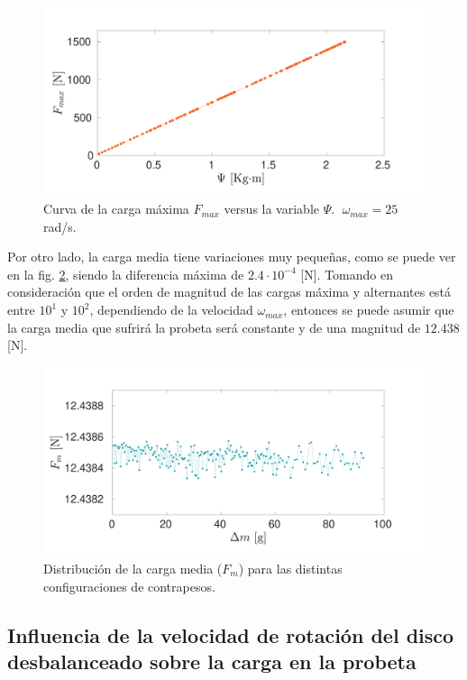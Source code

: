 \begin{figure}[]
\centering
\includegraphics[width=\linewidth, trim={0cm 1cm 2cm 2cm},clip]{Imagenes/fmax_psi.pdf}
\caption{Curva de la carga máxima $F_{max}$ versus la variable $\Psi$. $\; \omega_{max}=25$ rad/s.}
\label{fig:fmax_psi}
\end{figure}
 
Por otro lado, la carga media tiene variaciones muy pequeñas, como se puede ver en la fig. \ref{fig:fm_dm}, siendo la diferencia máxima de $2.4\cdot10^{-4}$ [N]. Tomando en consideración que el orden de magnitud de las cargas máxima y alternantes está entre $10^1$ y $10^2$, dependiendo de la velocidad $\omega_{max}$, entonces se puede asumir que la carga media que sufrirá la probeta será constante y de una magnitud de $12.438$ [N]. 

\begin{figure}[]
\centering
\includegraphics[width=\linewidth, trim={0cm 1cm 2cm 2cm},clip]{Imagenes/fm_dm.pdf}
\caption{Distribución de la carga media ($F_m$) para las distintas configuraciones de contrapesos.}
\label{fig:fm_dm}
\end{figure}

\subsection{Influencia de la velocidad de rotación del disco desbalanceado sobre la carga en la probeta}

